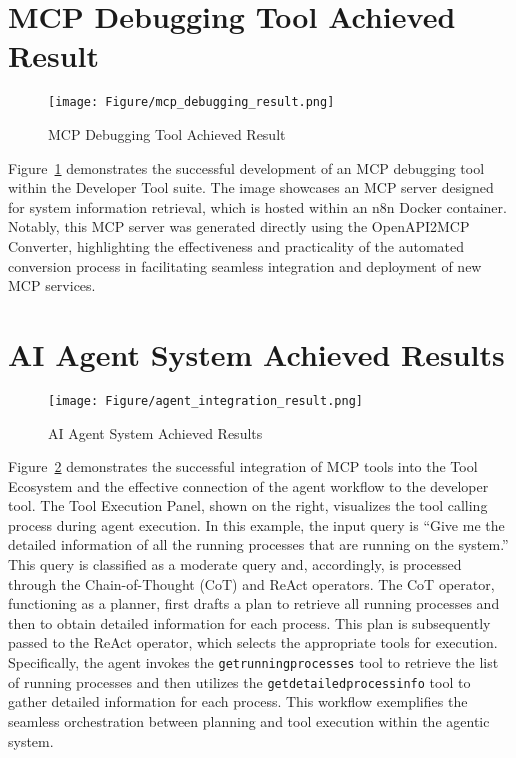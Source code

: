 \documentclass[../Main.tex]{subfiles}
\begin{document}
	\section{MCP Debugging Tool Achieved Result}
    \label{section:6.3_mcp_debugging_tool_achieved_result}
	\begin{figure}[h]
		\centering
		\texttt{[image: Figure/mcp\_debugging\_result.png]}
		\caption{MCP Debugging Tool Achieved Result}
		\label{fig:mcp_debugging_result}
	\end{figure}
	Figure~\ref{fig:mcp_debugging_result} demonstrates the successful development of
	an MCP debugging tool within the Developer Tool suite. The image showcases an
	MCP server designed for system information retrieval, which is hosted within an
	n8n Docker container. Notably, this MCP server was generated directly using the
	OpenAPI2MCP Converter, highlighting the effectiveness and practicality of the
	automated conversion process in facilitating seamless integration and
	deployment of new MCP services.

	\section{AI Agent System Achieved Results}
    \label{section:6.4_ai_agent_system_achieved_results}
	\begin{figure}[h]
		\centering
		\texttt{[image: Figure/agent\_integration\_result.png]}
		\caption{AI Agent System Achieved Results}
		\label{fig:ai_agent_result}
	\end{figure}
	Figure~\ref{fig:ai_agent_result} demonstrates the successful integration of
	MCP tools into the Tool Ecosystem and the effective connection of the agent
	workflow to the developer tool. The Tool Execution Panel, shown on the right, visualizes
	the tool calling process during agent execution. In this example, the input query
	is “Give me the detailed information of all the running processes that are running
	on the system.” This query is classified as a moderate query and, accordingly,
	is processed through the Chain-of-Thought (CoT) and ReAct operators. The CoT
	operator, functioning as a planner, first drafts a plan to retrieve all
	running processes and then to obtain detailed information for each process. This
	plan is subsequently passed to the ReAct operator, which selects the
	appropriate tools for execution. Specifically, the agent invokes the \texttt{getrunningprocesses}
	tool to retrieve the list of running processes and then utilizes the \texttt{getdetailedprocessinfo}
	tool to gather detailed information for each process. This workflow exemplifies
	the seamless orchestration between planning and tool execution within the agentic
	system.
\end{document}
